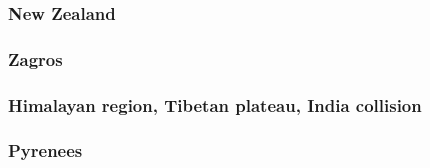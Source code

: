 \cite{pfsb02}
\cite{buge05}

\subsubsection*{New Zealand} 

\cite{koon90}
\cite{brbe95}
\cite{bekh96}
\cite{babr99}
\cite{libi06}
\cite{gedh02}\cite{pybf02}
\cite{gehd03}\cite{konc03}\cite{upke03}
\cite{pyeg10}
\cite{grel12}

\subsubsection*{Zagros}

\cite{vech06}
\cite{hamo10}
\cite{yakm11}
\cite{nipc13}
\cite{frba14}
\cite{ghbu14}
\cite{rugb17}

\subsubsection*{Himalayan region, Tibetan plateau, India collision} 

\cite{bird78}
\cite{moln89}
\cite{moem93}
\cite{wibe94}
\cite{chmm95}
\cite{robk97}
\cite{cblk00}\cite{clro00}
\cite{bejn01}\cite{laav01}\cite{zemk01}\cite{tzrm01}
\cite{kozc02}
\cite{reta03}
\cite{bejn04}
\cite{clbr05}
\cite{clrw06}
\cite{busc08}
\cite{hamo10}
\cite{care13}\cite{mutg13}\cite{chgz13}\cite{chgz13b}
\cite{whbb14}
\cite{bube17}
\cite{pirf18}
\cite{sccs19}

\subsubsection*{Pyrenees} 

\cite{giju98}
\cite{bemh00}
\cite{mcmg04}
\cite{jaml10}
\cite{fihv13b}
\cite{dual19}

